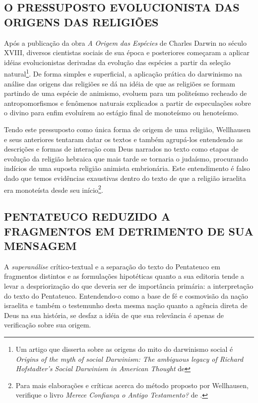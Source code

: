 \documentclass[
    article,            %
	12pt,				%
	oneside,			%
	a4paper,			%
	english,			%
	french,				%
	spanish,			%
	brazil				%
	]{abntex2}
\begin{document}
\subsection{O PRESSUPOSTO EVOLUCIONISTA DAS ORIGENS DAS RELIGIÕES}
Após a publicação da obra \emph{A Origem das Espécies} de Charles Darwin no século XVIII, diversos cientistas sociais de sua época e posteriores começaram a aplicar idéias evolucionistas derivadas da evolução das espécies a partir da seleção natural\footnote{Um artigo que disserta sobre as origens do mito do darwinismo social é \emph{Origins of the myth of social Darwinism: The ambiguous legacy of Richard Hofstadter's Social Darwinism in American Thought} de }. De forma simples e superficial, a aplicação prática do darwinismo na análise das origens das religiões se dá na idéia de que as religiões se formam partindo de uma espécie de animismo, evoluem para um politeísmo recheado de antropomorfismos e fenômenos naturais explicados a partir de especulações sobre o divino para enfim evoluírem ao estágio final de monoteísmo ou henoteísmo.

Tendo este pressuposto como única forma de origem de uma religião, Wellhausen e seus anteriores tentaram datar os textos e também agrupá-los entendendo as descrições e formas de interação com Deus narrados no texto como etapas de evolução da religião hebraica que mais tarde se tornaria o judaísmo, procurando indícios de uma suposta religião animista embrionária. Este entendimento é falso dado que temos evidências exaustivas dentro do texto de que a religião israelita era monoteísta desde seu início\footnote{Para mais elaborações e críticas acerca do método proposto por Wellhausen, verifique o livro \emph{Merece Confiança o Antigo Testamento?} de .}.

\subsection{PENTATEUCO REDUZIDO A FRAGMENTOS EM DETRIMENTO DE SUA MENSAGEM}
A \emph{superanálise} crítico-textual e a separação do texto do Pentateuco em fragmentos distintos e as formulações hipotéticas quanto a sua editoria tende a levar a despriorização do que deveria ser de importância primária: a interpretação do texto do Pentateuco. Entendendo-o como a base de fé e cosmovisão da nação israelita e também o testemunho desta mesma nação quanto a agência direta de Deus na sua história, se desfaz a idéia de que sua relevância é apenas de verificação sobre sua origem.
\end{document}
